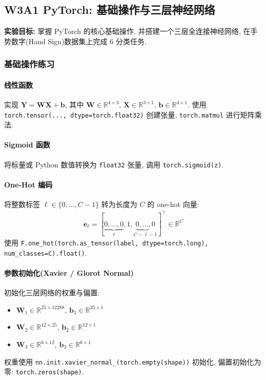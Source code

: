 \documentclass{../../nndlcourse}
\begin{document}
\subsection*{W3A1 PyTorch: 基础操作与三层神经网络}

\textbf{实验目标: }掌握 PyTorch 的核心基础操作, 并搭建一个三层全连接神经网络, 在手势数字(Hand Sign)数据集上完成 6 分类任务.

\subsubsection*{基础操作练习}

\paragraph{线性函数}
实现 $\boldsymbol{Y} = \boldsymbol{W}\boldsymbol{X} + \boldsymbol{b}$, 其中 $\boldsymbol{W}\in\mathbb{R}^{4\times 3}$, $\boldsymbol{X}\in\mathbb{R}^{3\times 1}$, $\boldsymbol{b}\in\mathbb{R}^{4\times 1}$.
使用 \texttt{torch.tensor(..., dtype=torch.float32)} 创建张量, \texttt{torch.matmul} 进行矩阵乘法.

\paragraph{Sigmoid 函数}
将标量或 Python 数值转换为 \texttt{float32} 张量, 调用 \texttt{torch.sigmoid(z)}.

\paragraph{One-Hot 编码}
将整数标签 $\ell \in \{0, \ldots, C-1\}$ 转为长度为 $C$ 的 one-hot 向量: 
\begin{align}
    \boldsymbol{e}_\ell = [\underbrace{0, \ldots, 0}_{\ell}, 1, \underbrace{0, \ldots, 0}_{C-\ell-1}]^\top \in \mathbb{R}^C
\end{align}
使用 \texttt{F.one\_hot(torch.as\_tensor(label, dtype=torch.long), num\_classes=C).float()}.

\paragraph{参数初始化(Xavier / Glorot Normal)}
初始化三层网络的权重与偏置: 
\begin{itemize}
    \item $\boldsymbol{W}_1 \in \mathbb{R}^{25 \times 12288}$, $\boldsymbol{b}_1 \in \mathbb{R}^{25 \times 1}$
    \item $\boldsymbol{W}_2 \in \mathbb{R}^{12 \times 25}$, $\boldsymbol{b}_2 \in \mathbb{R}^{12 \times 1}$
    \item $\boldsymbol{W}_3 \in \mathbb{R}^{6 \times 12}$, $\boldsymbol{b}_3 \in \mathbb{R}^{6 \times 1}$
\end{itemize}
权重使用 \texttt{nn.init.xavier\_normal\_(torch.empty(shape))} 初始化, 偏置初始化为零: \texttt{torch.zeros(shape)}.
\end{document}
